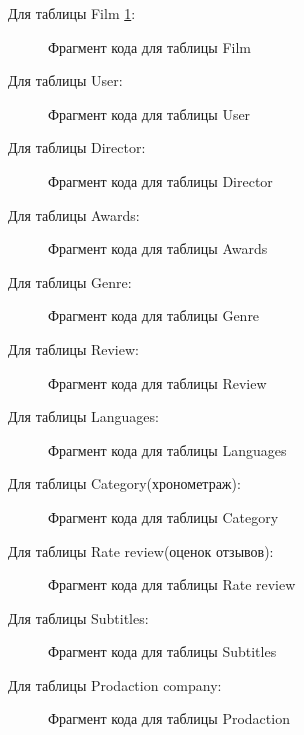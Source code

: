 Для таблицы Film \ref{film}:
\begin{figure} [H]
    \caption{Фрагмент кода для таблицы Film}
    \label{film}
\end{figure}

Для таблицы User:
\begin{figure} [H]
    \caption{Фрагмент кода для таблицы User}
\end{figure}

Для таблицы Director:
\begin{figure} [H]
    \caption{Фрагмент кода для таблицы Director}
\end{figure}

Для таблицы Awards:
\begin{figure} [H]
    \caption{Фрагмент кода для таблицы Awards}
\end{figure}

Для таблицы Genre:
\begin{figure} [H]
    \caption{Фрагмент кода для таблицы Genre}
\end{figure}

Для таблицы Review:
\begin{figure} [H]
    \caption{Фрагмент кода для таблицы Review}
\end{figure}

Для таблицы Languages:
\begin{figure} [H]
    \caption{Фрагмент кода для таблицы Languages}
\end{figure}

Для таблицы Category(хронометраж):
\begin{figure} [H]
    \caption{Фрагмент кода для таблицы Category}
\end{figure}

Для таблицы Rate review(оценок отзывов):
\begin{figure} [H]
    \caption{Фрагмент кода для таблицы Rate review}
\end{figure}

Для таблицы Subtitles:
\begin{figure} [H]
    \caption{Фрагмент кода для таблицы Subtitles}
\end{figure}

 Для таблицы Prodaction company:
\begin{figure} [H]
    \caption{Фрагмент кода для таблицы Prodaction}
\end{figure}




